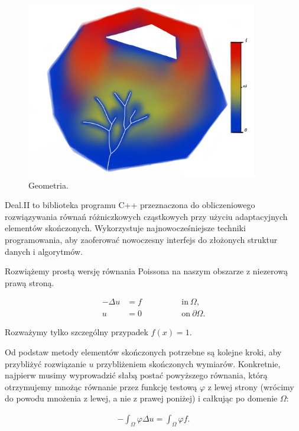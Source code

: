 \documentclass[]{pracamgr}
\begin{document}
      \begin{figure}[H]
        \centering
        \includegraphics[width=0.9\textwidth]{figs/solver.png}        
        \caption {Geometria.}
        \label{solver}
      \end{figure}

      Deal.II\cite{dealII94} to biblioteka programu C++ przeznaczona do obliczeniowego rozwiązywania równań różniczkowych cząstkowych przy użyciu adaptacyjnych elementów skończonych. Wykorzystuje najnowocześniejsze techniki programowania, aby zaoferować nowoczesny interfejs do złożonych struktur danych i algorytmów.

      Rozwiążemy prostą wersję równania Poissona na naszym obszarze z niezerową prawą stroną.
      
      \begin{align*}
        -\Delta u &= f \qquad\qquad & \text{in}\ \Omega,
        \\
        u &= 0 \qquad\qquad & \text{on}\ \partial\Omega.
      \end{align*}
      
      Rozważymy tylko szczególny przypadek $f(x)=1$.

      Od podstaw metody elementów skończonych potrzebne są kolejne kroki, aby przybliżyć rozwiązanie $u$ przybliżeniem skończonych wymiarów. Konkretnie, najpierw musimy wyprowadzić słabą postać powyższego równania, którą otrzymujemy mnożąc równanie przez funkcję testową $\varphi$ z lewej strony (wrócimy do powodu mnożenia z lewej, a nie z prawej poniżej) i całkując po domenie $\Omega$:
      
      \begin{align*}
        -\int_\Omega \varphi \Delta u = \int_\Omega \varphi f.
      \end{align*}
      
\end{document}
